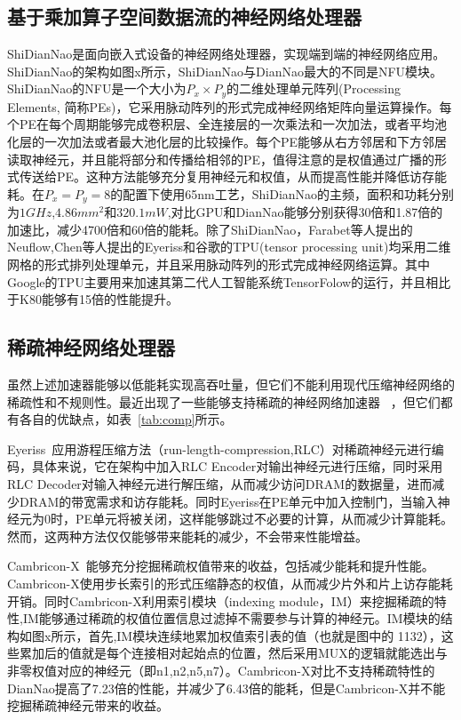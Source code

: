 \subsection{基于乘加算子空间数据流的神经网络处理器}
ShiDianNao是面向嵌入式设备的神经网络处理器，实现端到端的神经网络应用。ShiDianNao的架构如图x所示，ShiDianNao与DianNao最大的不同是NFU模块。ShiDianNao的NFU是一个大小为$P_x\times P_y$的二维处理单元阵列(Processing Elements, 简称PEs)，它采用脉动阵列的形式完成神经网络矩阵向量运算操作。每个PE在每个周期能够完成卷积层、全连接层的一次乘法和一次加法，或者平均池化层的一次加法或者最大池化层的比较操作。每个PE能够从右方邻居和下方邻居读取神经元，并且能将部分和传播给相邻的PE，值得注意的是权值通过广播的形式传送给PE。这种方法能够充分复用神经元和权值，从而提高性能并降低访存能耗。在$P_x=P_y=8$的配置下使用65nm工艺，ShiDianNao的主频，面积和功耗分别为$1GHz$,$4.86mm^2$和$320.1mW$,对比GPU和DianNao能够分别获得30倍和1.87倍的加速比，减少4700倍和60倍的能耗。除了ShiDianNao，Farabet等人提出的Neuflow,Chen等人提出的Eyeriss和谷歌的TPU(tensor processing unit)均采用二维网格的形式排列处理单元，并且采用脉动阵列的形式完成神经网络运算。其中Google的TPU主要用来加速其第二代人工智能系统TensorFolow的运行，并且相比于K80能够有15倍的性能提升。


\subsection{稀疏神经网络处理器}
虽然上述加速器能够以低能耗实现高吞吐量，但它们不能利用现代压缩神经网络的稀疏性和不规则性。最近出现了一些能够支持稀疏的神经网络加速器~\cite{chen2017eyeriss,zhang2016cambricon,albericio2016cnvlutin,han2016eie,han2017ese,angshuman2017scnn}
，但它们都有各自的优缺点，如表~\ref{tab:comp}所示。

Eyeriss~\cite{chen2017eyeriss}应用游程压缩方法（run-length-compression,RLC）对稀疏神经元进行编码，具体来说，它在架构中加入RLC Encoder对输出神经元进行压缩，同时采用RLC Decoder对输入神经元进行解压缩，从而减少访问DRAM的数据量，进而减少DRAM的带宽需求和访存能耗。同时Eyeriss在PE单元中加入控制门，当输入神经元为0时，PE单元将被关闭，这样能够跳过不必要的计算，从而减少计算能耗。然而，这两种方法仅仅能够带来能耗的减少，不会带来性能增益。

Cambricon-X~\cite{zhang2016cambricon}能够充分挖掘稀疏权值带来的收益，包括减少能耗和提升性能。Cambricon-X使用步长索引的形式压缩静态的权值，从而减少片外和片上访存能耗开销。同时Cambricon-X利用索引模块（indexing module，IM）来挖掘稀疏的特性,IM能够通过稀疏的权值位置信息过滤掉不需要参与计算的神经元。IM模块的结构如图x所示，首先,IM模块连续地累加权值索引表的值（也就是图中的 1132），这些累加后的值就是每个连接相对起始点的位置，然后采用MUX的逻辑就能选出与非零权值对应的神经元（即n1,n2,n5,n7）。Cambricon-X对比不支持稀疏特性的DianNao提高了7.23倍的性能，并减少了6.43倍的能耗，但是Cambricon-X并不能挖掘稀疏神经元带来的收益。

